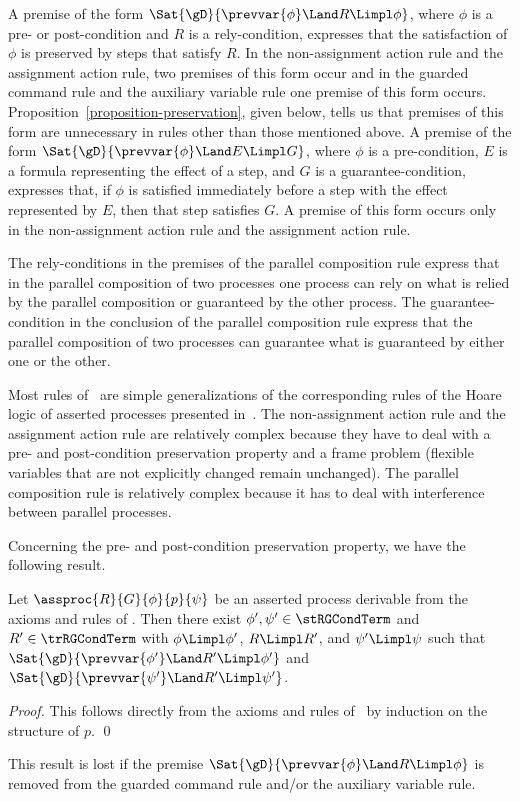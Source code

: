 \documentclass[runningheads]{llncs}
\begin{document}
A premise of the form $\Sat{\gD}{\prevvar{\phi} \Land R \Limpl \phi}$,
where $\phi$ is a pre- or post-condition \linebreak[2] and $R$ is a 
rely-condition, expresses that the satisfaction of $\phi$ is preserved 
by steps that satisfy $R$.
In the non-assignment action rule and the assignment action rule, two 
premises of this form occur and in the guarded command rule and the 
auxiliary variable rule one premise of this form occurs. 
Proposition~\ref{proposition-preservation}, given below, tells us that 
premises of this form are unnecessary in rules other than those 
mentioned above.
A premise of the form $\Sat{\gD}{\prevvar{\phi} \Land E \Limpl G}$,
where $\phi$ is a pre-condition, $E$ is a formula representing the 
effect of a step, and $G$ is a guarantee-condition, expresses that, if 
$\phi$ is satisfied immediately before a step with the effect 
represented by $E$, then that step satisfies $G$.
A premise of this form occurs only in the non-assignment action rule and 
the assignment action rule.

The rely-conditions in the premises of the parallel composition rule 
express that in the parallel composition of two processes one process 
can rely on what is relied by the parallel composition or guaranteed by 
the other process.
The guarantee-condition in the conclusion of the parallel composition 
rule express that the parallel composition of two processes can 
guarantee what is guaranteed by either one or the other.

Most rules of \RG\ are simple generalizations of the corresponding rules 
of the Hoare logic of asserted processes presented in~\cite{BM19b}.
The non-assignment action rule and the assignment action rule are 
relatively complex because they have to deal with a pre- and 
post-condition preservation property and a frame problem (flexible 
variables that are not explicitly changed remain unchanged).
The parallel composition rule is relatively complex because it has to 
deal with interference between parallel processes.


Concerning the pre- and post-condition preservation property, we have 
the following result.
%
\begin{proposition}
\label{proposition-preservation}
Let $\assproc{R}{G}{\phi}{p}{\psi}$ be an asserted process  
derivable from the axioms and rules of \RG.
Then there exist $\phi',\psi' \in \stRGCondTerm$ and 
{$R' \in \trRGCondTerm$} with $\phi \Limpl \phi'$, $R \Limpl R'$, and
$\psi' \Limpl \psi$ such that 
$\Sat{\gD}{\prevvar{\phi'} \Land R' \Limpl \phi'}$ and 
$\Sat{\gD}{\prevvar{\psi'} \Land R' \Limpl \psi'}$.
\end{proposition}
%
\begin{proof}
This follows directly from the axioms and rules of \RG\ by induction on 
the structure of $p$.
\qed
\end{proof}
%
This result is lost if the premise
$\Sat{\gD}{\prevvar{\phi} \Land R \Limpl \phi}$ is removed from the 
guarded command rule and/or the auxiliary variable rule.
\end{document}
